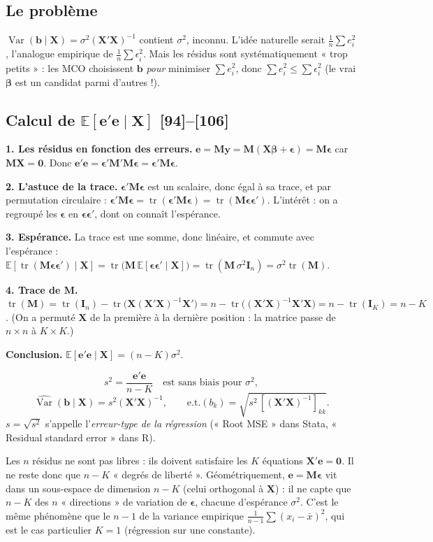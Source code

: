 \documentclass[11pt,a4paper]{article}
\newcommand{\vy}{\mathbf{y}}
\newcommand{\vX}{\mathbf{X}}
\newcommand{\ve}{\mathbf{e}}
\newcommand{\vb}{\mathbf{b}}
\newcommand{\vbeta}{\bm{\beta}}
\newcommand{\veps}{\bm{\epsilon}}
\newcommand{\Mm}{\mathbf{M}}
\newcommand{\I}{\mathbf{I}}
\newcommand{\XtXi}{(\vX'\vX)^{-1}}
\newcommand{\E}{\mathbb{E}}
\newcommand{\Var}{\operatorname{Var}}
\newcommand{\tr}{\operatorname{tr}}
\begin{document}
\subsection{Le problème}
$\Var(\vb\mid\vX)=\sigma^2\XtXi$ contient $\sigma^2$, inconnu. L'idée naturelle serait $\frac1n\sum e_i^2$, l'analogue empirique de $\frac1n\sum\epsilon_i^2$. Mais les résidus sont systématiquement « trop petits » : les MCO choisissent $\vb$ \emph{pour} minimiser $\sum e_i^2$, donc $\sum e_i^2\le\sum\epsilon_i^2$ (le vrai $\vbeta$ est un candidat parmi d'autres !).

\subsection{Calcul de $\E[\ve'\ve\mid\vX]$ [94]--[106]}
\begin{detail}
\textbf{1. Les résidus en fonction des erreurs.} $\ve=\Mm\vy=\Mm(\vX\vbeta+\veps)=\Mm\veps$ car $\Mm\vX=\mathbf 0$. Donc $\ve'\ve=\veps'\Mm'\Mm\veps=\veps'\Mm\veps$.

\textbf{2. L'astuce de la trace.} $\veps'\Mm\veps$ est un scalaire, donc égal à sa trace, et par permutation circulaire :
$\veps'\Mm\veps=\tr(\veps'\Mm\veps)=\tr(\Mm\veps\veps')$.
L'intérêt : on a regroupé les $\veps$ en $\veps\veps'$, dont on connaît l'espérance.

\textbf{3. Espérance.} La trace est une somme, donc linéaire, et commute avec l'espérance :
$\E[\tr(\Mm\veps\veps')\mid\vX]=\tr\big(\Mm\,\E[\veps\veps'\mid\vX]\big)=\tr(\Mm\,\sigma^2\I_n)=\sigma^2\tr(\Mm)$.

\textbf{4. Trace de $\Mm$.}
$\tr(\Mm)=\tr(\I_n)-\tr\big(\vX\XtXi\vX'\big)=n-\tr\big(\XtXi\vX'\vX\big)=n-\tr(\I_K)=n-K$.
(On a permuté $\vX$ de la première à la dernière position : la matrice passe de $n\times n$ à $K\times K$.)

\textbf{Conclusion.} $\E[\ve'\ve\mid\vX]=(n-K)\sigma^2$.
\end{detail}

\begin{resultat}
\[
s^2=\frac{\ve'\ve}{n-K}\quad\text{est sans biais pour }\sigma^2,
\]
\[
\widehat{\Var}(\vb\mid\vX)=s^2\XtXi,\qquad
\text{e.t.}(b_k)=\sqrt{s^2\,[\XtXi]_{kk}} .
\]
$s=\sqrt{s^2}$ s'appelle l'\emph{erreur-type de la régression} (« Root MSE » dans Stata, « Residual standard error » dans R).
\end{resultat}

\begin{intuition}[title={Intuition : les degrés de liberté}]
Les $n$ résidus ne sont pas libres : ils doivent satisfaire les $K$ équations $\vX'\ve=\mathbf 0$. Il ne reste donc que $n-K$ « degrés de liberté ». Géométriquement, $\ve=\Mm\veps$ vit dans un sous-espace de dimension $n-K$ (celui orthogonal à $\vX$) : il ne capte que $n-K$ des $n$ « directions » de variation de $\veps$, chacune d'espérance $\sigma^2$. C'est le même phénomène que le $n-1$ de la variance empirique $\frac1{n-1}\sum(x_i-\bar x)^2$, qui est le cas particulier $K=1$ (régression sur une constante).
\end{intuition}
\end{document}
